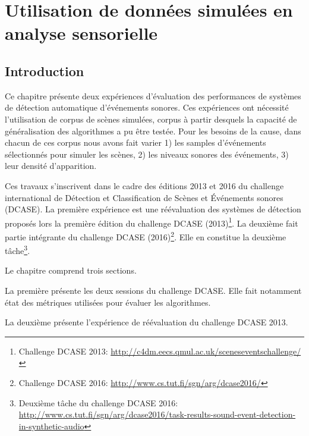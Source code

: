 \chapter[Données simulées et analyse automatique]{Utilisation de données simulées en analyse sensorielle}\label{ch:ml_simuperf}

\section{Introduction}

Ce chapitre présente deux expériences d'évaluation des performances de systèmes de détection automatique d'événements sonores. Ces expériences ont nécessité l'utilisation de corpus de scènes simulées, corpus à partir desquels la capacité de généralisation des algorithmes a pu être testée. Pour les besoins de la cause, dans chacun de ces corpus nous avons fait varier 1) les samples d'événements sélectionnés pour simuler les scènes, 2) les niveaux sonores des événements, 3) leur densité d'apparition.

Ces travaux s'inscrivent dans le cadre des éditions 2013 et 2016 du challenge international de Détection et Classification de Scènes et Événements sonores (DCASE). La première expérience est une réévaluation des systèmes de détection proposés lors la première édition du challenge DCASE (2013)\footnote{Challenge DCASE 2013: \url{http://c4dm.eecs.qmul.ac.uk/sceneseventschallenge/}}. La deuxième fait partie intégrante du challenge DCASE (2016)\footnote{Challenge DCASE 2016: \url{http://www.cs.tut.fi/sgn/arg/dcase2016/}}. Elle en constitue la deuxième tâche\footnote{Deuxième tâche du challenge DCASE 2016: \url{http://www.cs.tut.fi/sgn/arg/dcase2016/task-results-sound-event-detection-in-synthetic-audio}}.

Le chapitre comprend trois sections.

La première présente les deux sessions du challenge DCASE. Elle fait notamment état des métriques utilisées pour évaluer les algorithmes.

La deuxième présente l'expérience de réévaluation du challenge DCASE 2013.

